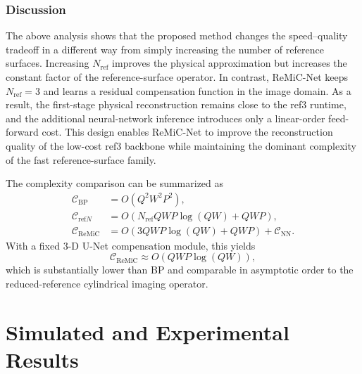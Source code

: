 \documentclass[journal]{IEEEtran}
\begin{document}
\subsubsection{Discussion}

The above analysis shows that the proposed method changes the speed--quality tradeoff in a different way from simply increasing the number of reference surfaces. Increasing $N_{\mathrm{ref}}$ improves the physical approximation but increases the constant factor of the reference-surface operator. In contrast, ReMiC-Net keeps $N_{\mathrm{ref}}=3$ and learns a residual compensation function in the image domain. As a result, the first-stage physical reconstruction remains close to the ref3 runtime, and the additional neural-network inference introduces only a linear-order feed-forward cost. This design enables ReMiC-Net to improve the reconstruction quality of the low-cost ref3 backbone while maintaining the dominant complexity of the fast reference-surface family.

The complexity comparison can be summarized as
\begin{equation}
\begin{aligned}
    \mathcal{C}_{\mathrm{BP}}
    &= O\left(Q^2W^2P^2\right), \\
    \mathcal{C}_{\mathrm{ref}N}
    &= O\left(N_{\mathrm{ref}}QWP\log(QW)+QWP\right), \\
    \mathcal{C}_{\mathrm{ReMiC}}
    &= O\left(3QWP\log(QW)+QWP\right)+\mathcal{C}_{\mathrm{NN}}.
\end{aligned}
\end{equation}
With a fixed 3-D U-Net compensation module, this yields
\begin{equation}
    \mathcal{C}_{\mathrm{ReMiC}}
    \approx O\left(QWP\log(QW)\right),
\end{equation}
which is substantially lower than BP and comparable in asymptotic order to the reduced-reference cylindrical imaging operator.



\section{Simulated and Experimental Results}
\label{sec:results}
\end{document}
